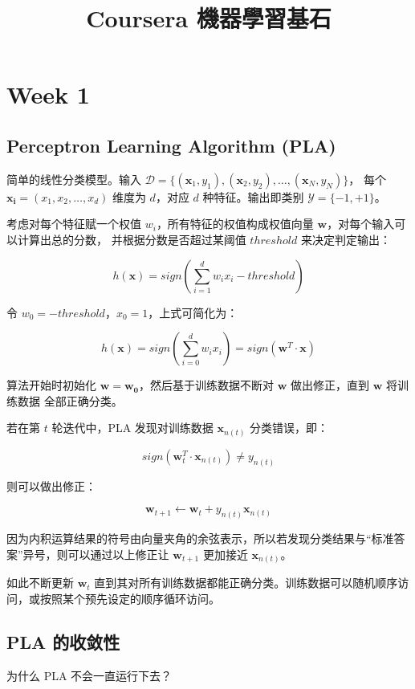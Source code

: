 \documentclass[a4paper]{article}
\begin{document}
\title{Coursera 機器學習基石}
\maketitle

\section{Week 1}
\subsection{Perceptron Learning Algorithm (PLA)}
简单的线性分类模型。输入 $\mathcal{D} = \{(\mathbf{x}_1, y_1), (\mathbf{x}_2, y_2), \dots, (\mathbf{x}_N, y_N)\}$，
每个 $\mathbf{x_i} = (x_1, x_2, \dots, x_d)$ 维度为 $d$，对应 $d$ 种特征。输出即类别 $\mathcal{Y} = \{-1, +1\}$。

考虑对每个特征赋一个权值 $w_i$，所有特征的权值构成权值向量 $\mathbf{w}$，对每个输入可以计算出总的分数，
并根据分数是否超过某阈值 $threshold$ 来决定判定输出：

$$ h(\mathbf{x}) = sign(\displaystyle\sum_{i=1}^{d} w_ix_i - threshold) $$

令 $w_0 = -threshold$，$x_0 = 1$，上式可简化为：

$$ h(\mathbf{x}) = sign(\displaystyle\sum_{i=0}^{d} w_ix_i) = sign(\mathbf{w}^T \cdot \mathbf{x}) $$

算法开始时初始化 $\mathbf{w} = \mathbf{w_0}$，然后基于训练数据不断对 $\mathbf{w}$ 做出修正，直到 $\mathbf{w}$ 将训练数据
全部正确分类。

若在第 $t$ 轮迭代中，PLA 发现对训练数据 $\mathbf{x}_{n(t)}$ 分类错误，即：

$$sign(\mathbf{w}_t^T \cdot \mathbf{x}_{n(t)}) \neq y_{n(t)}$$

则可以做出修正：

$$\mathbf{w}_{t+1} \leftarrow \mathbf{w}_t + y_{n(t)}\mathbf{x}_{n(t)}$$

因为内积运算结果的符号由向量夹角的余弦表示，所以若发现分类结果与“标准答案”异号，则可以通过以上修正让 $\mathbf{w}_{t+1}$
更加接近 $\mathbf{x}_{n(t)}$。

如此不断更新 $\mathbf{w}_t$ 直到其对所有训练数据都能正确分类。训练数据可以随机顺序访问，或按照某个预先设定的顺序循环访问。

\subsection{PLA 的收敛性}
为什么 PLA 不会一直运行下去？
\end{document}
